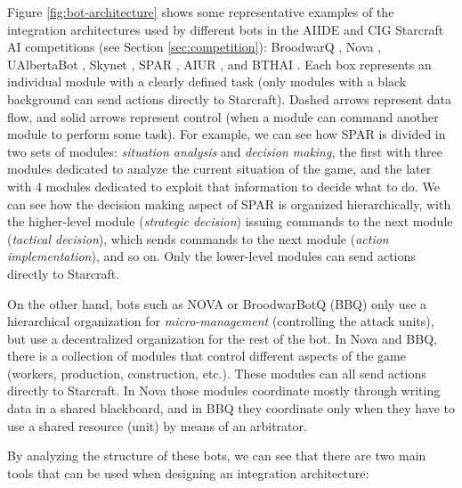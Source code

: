 \documentclass[journal]{IEEEtran}
\begin{document}
Figure \ref{fig:bot-architecture} shows some representative examples of the integration architectures used by different bots in the AIIDE and CIG Starcraft AI competitions (see Section \ref{sec:competition}): BroodwarQ \cite{???}, Nova \cite{???}, UAlbertaBot \cite{???}, Skynet \cite{???}, SPAR \cite{???}, AIUR \cite{???}, and BTHAI \cite{???}. Each box represents an individual module with a clearly defined task (only modules with a black background can send actions directly to Starcraft). Dashed arrows represent data flow, and solid arrows represent control (when a module can command another module to perform some task). For example, we can see how SPAR is divided in two sets of modules: {\em situation analysis} and {\em decision making}, the first with three modules dedicated to analyze the current situation of the game, and the later with 4 modules dedicated to exploit that information to decide what to do. We can see how the decision making aspect of SPAR is organized hierarchically, with the higher-level module ({\em strategic decision}) issuing commands to the next module ({\em tactical decision}), which sends commands to the next module ({\em action implementation}), and so on. Only the lower-level modules can send actions directly to Starcraft. 

On the other hand, bots such as NOVA or BroodwarBotQ (BBQ) only use a hierarchical organization for {\em micro-management} (controlling the attack units), but use a decentralized organization for the rest of the bot. In Nova and BBQ, there is a collection of modules that control different aspects of the game (workers, production, construction, etc.). These modules can all send actions directly to Starcraft. In Nova those modules coordinate mostly through writing data in a shared blackboard, and in BBQ they coordinate only when they have to use a shared resource (unit) by means of an arbitrator.

By analyzing the structure of these bots, we can see that there are two main tools that can be used when designing an integration architecture:
\end{document}
